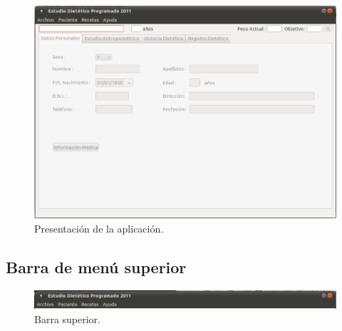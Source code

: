 \begin{figure}[H]
  \label{aplicacion}
  \begin{center}
    \includegraphics[scale=0.5]{../../Image/aplicacion.png} 
  \end{center}
  \caption{Presentación de la aplicación.}
\end{figure}


\subsection{Barra de menú superior}
\begin{figure}[H]
  \label{barra_superior}
  \begin{center}
    \includegraphics[scale=0.5]{../../Image/barra-superior.png}
  \end{center}
  \caption{Barra superior.}
\end{figure}

